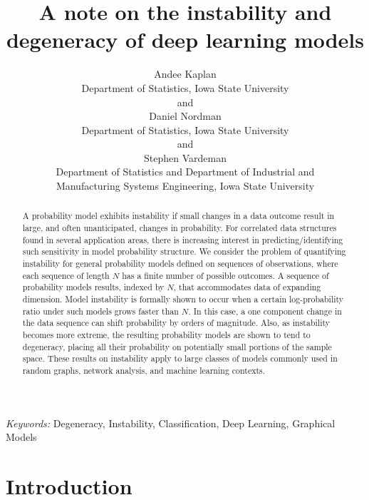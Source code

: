 \documentclass[12pt]{article}
\theoremstyle{definition}
\begin{document}
\def\spacingset#1{\renewcommand{\baselinestretch}%
{#1}\small\normalsize} \spacingset{1}

\title{\bf A note on the instability and degeneracy of deep learning models}
\author{Andee Kaplan \\ Department of Statistics, Iowa State University \\  and \\ Daniel Nordman \\ Department of Statistics, Iowa State University \\  and \\ Stephen Vardeman \\ Department of Statistics and Department of Industrial and\\
Manufacturing Systems Engineering, Iowa State University \\ }

\date{}
\maketitle
\begin{abstract}
A probability model exhibits instability if small changes in a data
outcome result in large, and often unanticipated, changes in
probability. For correlated data structures found in several application
areas, there is increasing interest in predicting/identifying such
sensitivity in model probability structure. We consider the problem of
quantifying instability for general probability models defined on
sequences of observations, where each sequence of length \(N\) has a
finite number of possible outcomes. A sequence of probability models
results, indexed by \(N\), that accommodates data of expanding
dimension. Model instability is formally shown to occur when a certain
log-probability ratio under such models grows faster than \(N\). In this
case, a one component change in the data sequence can shift probability
by orders of magnitude. Also, as instability becomes more extreme, the
resulting probability models are shown to tend to degeneracy, placing
all their probability on potentially small portions of the sample space.
These results on instability apply to large classes of models commonly
used in random graphs, network analysis, and machine learning contexts.
\end{abstract}
\noindent%
{\it Keywords:}  Degeneracy, Instability, Classification, Deep Learning, Graphical Models
\vfill

\newpage
\spacingset{1.45}


\section{Introduction}\label{introduction}
\end{document}
